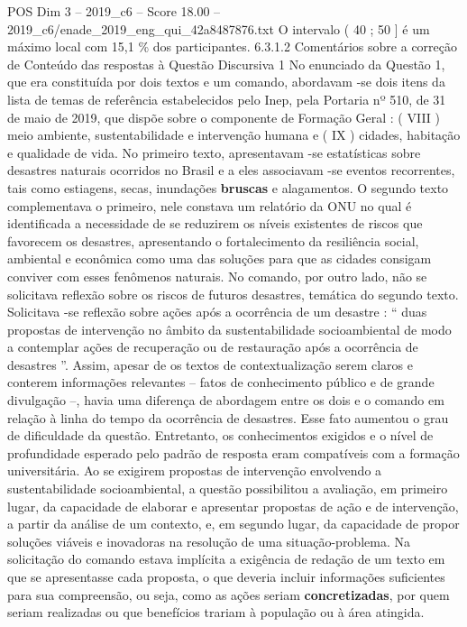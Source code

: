\begin{textsample}{POS Dim 3 – 2019\_c6 – Score 18.00 – 2019\_c6/enade\_2019\_eng\_qui\_42a8487876.txt}
O intervalo ( 40 ; 50 ] é um máximo local com 15,1 \% dos participantes. 6.3.1.2 Comentários sobre a correção de Conteúdo das respostas à Questão Discursiva 1 No enunciado da Questão 1, que era constituída por dois textos e um comando, abordavam -se dois itens da lista de temas de referência estabelecidos pelo Inep, pela Portaria nº 510, de 31 de maio de 2019, que dispõe sobre o componente de Formação Geral : ( VIII ) meio ambiente, sustentabilidade e intervenção humana e ( IX ) cidades, habitação e qualidade de vida.
No primeiro texto, apresentavam -se estatísticas sobre desastres naturais ocorridos no Brasil e a eles associavam -se eventos recorrentes, tais como estiagens, secas, inundações \textbf{bruscas} e alagamentos.
O segundo texto complementava o primeiro, nele constava um relatório da ONU no qual é identificada a necessidade de se reduzirem os níveis existentes de riscos que favorecem os desastres, apresentando o fortalecimento da resiliência social, ambiental e econômica como uma das soluções para que as cidades consigam conviver com esses fenômenos naturais.
No comando, por outro lado, não se solicitava reflexão sobre os riscos de futuros desastres, temática do segundo texto.
Solicitava -se reflexão sobre ações após a ocorrência de um desastre : “ duas propostas de intervenção no âmbito da sustentabilidade socioambiental de modo a contemplar ações de recuperação ou de restauração após a ocorrência de desastres ”.
Assim, apesar de os textos de contextualização serem claros e conterem informações relevantes – fatos de conhecimento público e de grande divulgação –, havia uma diferença de abordagem entre os dois e o comando em relação à linha do tempo da ocorrência de desastres.
Esse fato aumentou o grau de dificuldade da questão.
Entretanto, os conhecimentos exigidos e o nível de profundidade esperado pelo padrão de resposta eram compatíveis com a formação universitária.
Ao se exigirem propostas de intervenção envolvendo a sustentabilidade socioambiental, a questão possibilitou a avaliação, em primeiro lugar, da capacidade de elaborar e apresentar propostas de ação e de intervenção, a partir da análise de um contexto, e, em segundo lugar, da capacidade de propor soluções viáveis e inovadoras na resolução de uma situação-problema.
Na solicitação do comando estava implícita a exigência de redação de um texto em que se apresentasse cada proposta, o que deveria incluir informações suficientes para sua compreensão, ou seja, como as ações seriam \textbf{concretizadas}, por quem seriam realizadas ou que benefícios trariam à população ou à área atingida.

\end{textsample}
